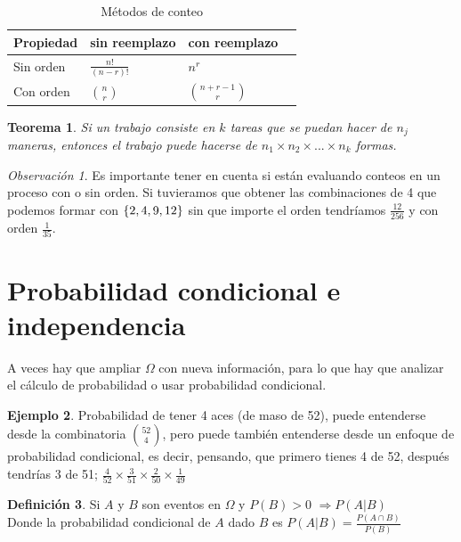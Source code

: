 \documentclass[11pt,a4paper,oneside]{report}
\theoremstyle{definition}
\newtheorem{definicion}{Definición}[chapter]
\newtheorem{ejemplo}[definicion]{Ejemplo}
\theoremstyle{plain}
\newtheorem{teorema}[definicion]{Teorema}
\theoremstyle{remark}
\newtheorem*{observacion}{Observación}
\DeclarePairedDelimiter{\conj}{\{}{\}}
\begin{document}
\begin{table}[H]
  \centering
  \caption{Métodos de conteo}
  \begin{tabular}{@{}l >{\centering\arraybackslash}p{2.2cm}
                    >{\centering\arraybackslash}p{2.2cm}
                    >{\centering\arraybackslash}p{2.2cm}@{}}
    \toprule
    \textbf{Propiedad} & sin reemplazo & con reemplazo \\
    \midrule
    Sin orden           & $\frac{n!}{(n-r)!}$ & $n^{r}$ \\
    Con orden         & $\binom{n}{r}$ & $\binom{n+r-1}{r}$ \\
    \bottomrule
  \end{tabular}
\end{table}

\begin{teorema}
  Si un trabajo consiste en $k$ tareas que se puedan hacer de $n_j$ maneras, entonces
  el trabajo puede hacerse de $n_1 \times n_2 \times ... \times n_k$ formas.
\end{teorema}

\begin{observacion}
  Es importante tener en cuenta si están evaluando conteos en un proceso con o sin orden. Si tuvieramos
  que obtener las combinaciones de 4 que podemos formar con $\conj{2,4,9,12}$ sin que importe el orden tendríamos
  $\frac{12}{256}$ y con orden $\frac{1}{35}$. 
\end{observacion}

\section{Probabilidad condicional e independencia}
A veces hay que ampliar $\Omega$ con nueva información, para lo que hay que analizar el cálculo de probabilidad
o usar probabilidad condicional. 

\begin{ejemplo}
  Probabilidad de tener 4 aces (de maso de 52), puede entenderse desde la combinatoria
  $\binom{52}{4}$, pero puede también entenderse desde un enfoque de probabilidad condicional, es decir,
  pensando, que primero tienes 4 de 52, después tendrías 3 de 51; $\frac{4}{52} \times \frac{3}{51} \times \frac{2}{50} \times \frac{1}{49}$
\end{ejemplo}

\begin{definicion}
  Si $A$ y $B$ son eventos en $\Omega$ y $P(B)>0$ $\Rightarrow P(A|B)$\\
  Donde la probabilidad condicional de $A$ dado $B$ es $P(A|B)=\frac{P(A\cap B)}{P(B)}$\\
\end{definicion}
\end{document}
